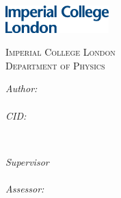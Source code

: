 \begin{titlepage}

\newcommand{\HRule}{\rule{\linewidth}{0.5mm}} %



\includegraphics[width = 4cm]{img/imperial.eps}\\[0.5cm] 

\center %


\textsc{\Large Imperial College London}\\[0.5cm] 
\textsc{\large Department of Physics}\\[0.5cm] 


\title{\reporttitle}
 

\begin{minipage}{0.4\textwidth}
\begin{flushleft} \large
\emph{Author:}\\
\reportauthor \\ %
\emph{CID:}\\
\CID
\end{flushleft}
\end{minipage}
~
\begin{minipage}{0.4\textwidth}
\begin{flushright} \large
\emph{Supervisor} \\
\supervisor \\ %
\emph{Assessor:} \\
\assessor
\end{flushright}
\end{minipage}\\[4cm]



\end{titlepage}
